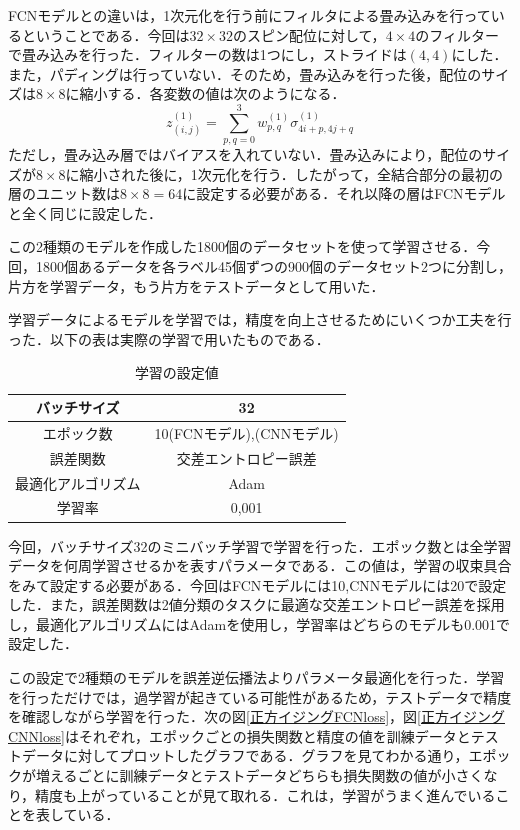 \documentclass[a4paper,11pt]{jsreport}
\begin{document}
FCNモデルとの違いは，1次元化を行う前にフィルタによる畳み込みを行っているということである．今回は$32 \times 32$のスピン配位に対して，$4 \times 4$のフィルターで畳み込みを行った．フィルターの数は1つにし，ストライドは$(4,4)$にした．また，パディングは行っていない．そのため，畳み込みを行った後，配位のサイズは$8 \times 8$に縮小する．各変数の値は次のようになる．
\begin{equation}
  z_{(i,j)}^{(1)}
  = \sum_{p,q=0}^{3} w_{p,q}^{(1)} \sigma_{4i+p,4j+q}^{(1)}
\end{equation}
ただし，畳み込み層ではバイアスを入れていない．畳み込みにより，配位のサイズが$8 \times 8$に縮小された後に，1次元化を行う．したがって，全結合部分の最初の層のユニット数は$8 \times 8 = 64$に設定する必要がある．それ以降の層はFCNモデルと全く同じに設定した．\par
この2種類のモデルを作成した1800個のデータセットを使って学習させる．今回，1800個あるデータを各ラベル45個ずつの900個のデータセット2つに分割し，片方を学習データ，もう片方をテストデータとして用いた．\par
学習データによるモデルを学習では，精度を向上させるためにいくつか工夫を行った．以下の表は実際の学習で用いたものである．

\begin{table}[]
  \centering
  \begin{tabular}{cc} \hline
    バッチサイズ & 32 \rule[0pt]{0pt}{1pt} \\ \hline
    エポック数 & 10(FCNモデル),\quad 20(CNNモデル) \rule[0pt]{0pt}{1pt} \\ \hline
    誤差関数 & 交差エントロピー誤差 \rule[0pt]{0pt}{1pt} \\\hline
    最適化アルゴリズム & Adam \rule[0pt]{0pt}{1pt} \\\hline
    学習率 & 0,001 \rule[0pt]{0pt}{1pt} \\\hline
  \end{tabular}
  \caption{学習の設定値}
  \label{学習で用いたもの}
\end{table}

今回，バッチサイズ32のミニバッチ学習で学習を行った．エポック数とは全学習データを何周学習させるかを表すパラメータである．この値は，学習の収束具合をみて設定する必要がある．今回はFCNモデルには10,CNNモデルには20で設定した．また，誤差関数は2値分類のタスクに最適な交差エントロピー誤差を採用し，最適化アルゴリズムにはAdamを使用し，学習率はどちらのモデルも0.001で設定した．\par
この設定で2種類のモデルを誤差逆伝播法よりパラメータ最適化を行った．学習を行っただけでは，過学習が起きている可能性があるため，テストデータで精度を確認しながら学習を行った．次の図\ref{正方イジングFCNloss}，図\ref{正方イジングCNNloss}はそれぞれ，エポックごとの損失関数と精度の値を訓練データとテストデータに対してプロットしたグラフである．グラフを見てわかる通り，エポックが増えるごとに訓練データとテストデータどちらも損失関数の値が小さくなり，精度も上がっていることが見て取れる．これは，学習がうまく進んでいることを表している．
\end{document}
